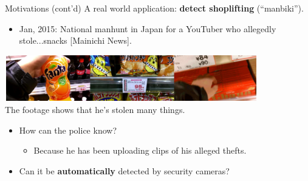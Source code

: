 \documentclass{beamer}
\begin{document}
\begin{frame}[t]{Motivations (cont'd)}
A real world application: \textbf{detect shoplifting} (``manbiki'').

\begin{itemize}
	\item Jan, 2015: National manhunt in Japan for a YouTuber who allegedly stole...snacks [Mainichi News].
\end{itemize}
	\begin{center}
		\includegraphics[width=11cm,height=2cm]{images/part1/snacks.png}
		\\
		The footage shows that he's stolen many things. 
	\end{center}
\begin{itemize}
	\item How can the police know? 
	\begin{itemize}
\item Because he has been uploading clips of his alleged thefts.
	\end{itemize}
	\item Can it be \textbf{automatically} detected by security cameras? 
\end{itemize}

\end{frame}
\end{document}
